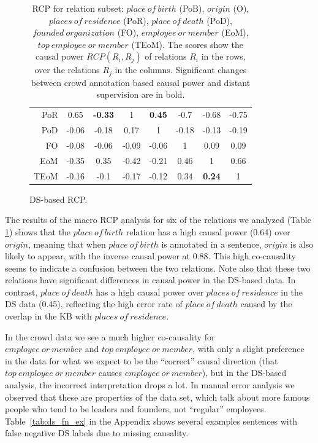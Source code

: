 \begin{table}[htb!]
\begin{subfigure}{\textwidth}
{\begin{tabular}{rccccccc}
     PoR   & 0.65  & \textbf{-0.33} & 1     & \textbf{0.45}  & -0.7  & -0.68 & -0.75 \\  
     \cellcolor{aliceblue}PoD   & \cellcolor{aliceblue}-0.06 & \cellcolor{aliceblue}-0.18 & \cellcolor{aliceblue}0.17  & \cellcolor{aliceblue}1     & \cellcolor{aliceblue}-0.18 & \cellcolor{aliceblue}-0.13 & \cellcolor{aliceblue}-0.19 \\ 
     FO    & -0.08 & -0.06 & -0.09 & -0.06 & 1     & 0.09  & 0.09 \\ 
     \cellcolor{aliceblue}EoM   & \cellcolor{aliceblue}-0.35 & \cellcolor{aliceblue}0.35  & \cellcolor{aliceblue}-0.42 & \cellcolor{aliceblue}-0.21 & \cellcolor{aliceblue}0.46  & \cellcolor{aliceblue}1     & \cellcolor{aliceblue}0.66 \\ 
     TEoM  & -0.16 & -0.1  & -0.17 & -0.12 & 0.34  & \textbf{0.24}  & 1 \\ \bottomrule
    \end{tabular}
    }
	\caption{DS-based RCP.}
    \label{tab:ds_rcp}
\end{subfigure}
\caption{RCP for relation subset: $place\ of\ birth$ (PoB), $origin$ (O), $places\ of\ residence$ (PoR), $place\ of\ death$ (PoD), $founded\ organization$ (FO), $employee\ or\ member$ (EoM), $top\ employee\ or\ member$ (TEoM). The scores show the causal power $RCP(R_i, R_j)$ of relations $R_i$ in the rows, over the relations $R_j$ in the columns. Significant changes between crowd annotation based causal power and distant supervision are in bold.}
\label{tab:rcp}
\end{table}

The results of the macro RCP analysis for six of the relations we analyzed (Table \ref{tab:rcp}) shows that the $place\ of\ birth$ relation has a high causal power (0.64) over $origin$, meaning that when $place\ of\ birth$ is annotated in a sentence, $origin$ is also likely to appear, with the inverse causal power at 0.88.  This high co-causality seems to indicate a confusion between the two relations. Note also that these two relations have significant differences in causal power in the DS-based data. In contrast, $place\ of\ death$ has a high causal power over $places\ of\ residence$ in the DS data (0.45), reflecting the high error rate of $place\ of\ death$ caused by the overlap in the KB with $places\ of\ residence$.

In the crowd data we see a much higher co-causality for \\ $employee\ or\ member$ and $top\ employee\ or\ member$, with only a slight preference in the data for what we expect to be the ``correct'' causal direction (that $top\ employee\ or\ member$ causes $employee\ or\ member$), but in the DS-based analysis, the incorrect interpretation drops a lot. In manual error analysis we observed that these are properties of the data set, which talk about more famous people who tend to be leaders and founders, not ``regular'' employees.  Table~\ref{tab:ds_fn_ex} in the Appendix shows several examples sentences with false negative DS labels due to missing causality.

